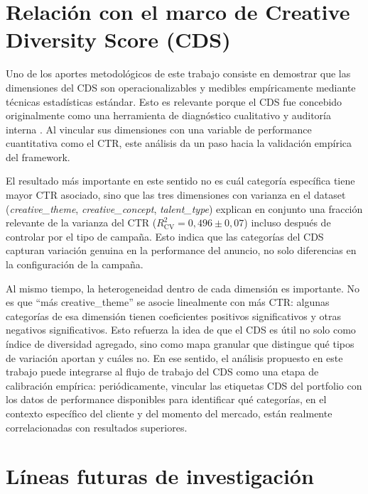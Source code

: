 \documentclass[12pt, a4paper]{report}
\begin{document}
\section{Relación con el marco de Creative Diversity Score (CDS)}

Uno de los aportes metodológicos de este trabajo consiste en demostrar que las
dimensiones del CDS son operacionalizables y medibles empíricamente mediante técnicas
estadísticas estándar. Esto es relevante porque el CDS fue concebido originalmente como
una herramienta de diagnóstico cualitativo y auditoría interna \citep{readyset2025}. Al
vincular sus dimensiones con una variable de performance cuantitativa como el CTR, este
análisis da un paso hacia la validación empírica del framework.

El resultado más importante en este sentido no es cuál categoría específica tiene mayor
CTR asociado, sino que las tres dimensiones con varianza en el dataset (\textit{creative\_theme},
\textit{creative\_concept}, \textit{talent\_type}) explican en conjunto una fracción relevante
de la varianza del CTR ($R^2_{\text{CV}} = 0{,}496 \pm 0{,}07$) incluso después de
controlar por el tipo de campaña. Esto indica que las categorías del CDS capturan
variación genuina en la performance del anuncio, no solo diferencias en la configuración
de la campaña.

Al mismo tiempo, la heterogeneidad dentro de cada dimensión es importante. No es que
``más creative\_theme'' se asocie linealmente con más CTR: algunas categorías de esa
dimensión tienen coeficientes positivos significativos y otras negativos significativos. Esto
refuerza la idea de que el CDS es útil no solo como índice de diversidad agregado, sino
como mapa granular que distingue qué tipos de variación aportan y cuáles no. En ese
sentido, el análisis propuesto en este trabajo puede integrarse al flujo de trabajo del CDS
como una etapa de calibración empírica: periódicamente, vincular las etiquetas CDS del
portfolio con los datos de performance disponibles para identificar qué categorías, en el
contexto específico del cliente y del momento del mercado, están realmente correlacionadas
con resultados superiores.

\section{Líneas futuras de investigación}
\end{document}
